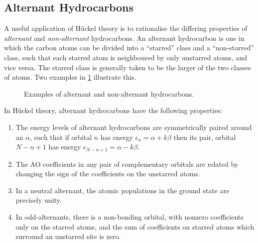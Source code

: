 \documentclass{article}
\theoremstyle{plain}\theoremheaderfont{\normalfont\itshape}\theorembodyfont{\rmfamily}\theoremseparator{.}\newtheorem*{rem}{Remark}\newtheorem*{ex}{Example}\newtheorem*{proof}{Proof}\newtheorem*{altp}{Alternative proof}
\theoremstyle{plain}\theoremheaderfont{\normalfont\bfseries}\theorembodyfont{\rmfamily}\theoremseparator{.}\newtheorem{thm}{Theorem}[section]\newtheorem{lem}[thm]{Lemma}\newtheorem{prop}[thm]{Proposition}\newtheorem*{cor}{Corollary}\newtheorem{defn}[thm]{Definition}\newtheorem{clm}[thm]{Claim}\newtheorem{clminproof}{Claim}\newtheorem{pos}{Postulate}[section]
\theoremstyle{break}\theoremheaderfont{\normalfont\itshape}\theorembodyfont{\rmfamily}\theoremseparator{.\medskip}\newtheorem*{proofskip}{Proof}\newtheorem*{exs}{Examples}\newtheorem*{rems}{Remarks}
\theoremstyle{break}\theoremheaderfont{\normalfont\bfseries}\theorembodyfont{\rmfamily}\theoremseparator{.\medskip}\newtheorem{lemskip}[thm]{Lemma}\newtheorem{defnskip}[thm]{Definition}\newtheorem{propskip}[thm]{Proposition}\newtheorem{thmskip}[thm]{Theorem}
\numberwithin{equation}{section}
\begin{document}
    \subsection{Alternant Hydrocarbons}
    A useful application of H\"{u}ckel theory is to rationalise the differing properties of \textit{alternant} and \textit{non-alternant} hydrocarbons. An alternant hydrocarbon is one in which the carbon atoms can be divided into a ``starred'' class and a ``non-starred'' class, such that each starred atom is neighboured by only unstarred atoms, and vice versa. The starred class is generally taken to be the larger of the two classes of atoms. Two examples in \cref{Fig:Alternant_Hydrocarbon} illustrate this.
    \begin{figure}
        \centering
        \caption{Examples of alternant and non-alternant hydrocarbons.}
        \label{Fig:Alternant_Hydrocarbon}
    \end{figure}

    In H\"{u}ckel theory, alternant hydrocarbons have the following properties:
    \begin{enumerate}[topsep=0pt,label=(\roman*)]
        \item The energy levels of alternant hydrocarbons are symmetrically paired around an \(\alpha\), such that if orbital \(n\) has energy \(\epsilon_n=\alpha+k\beta\) then its pair, orbital \(N-n+1\) has energy \(\epsilon_{N-n+1}=\alpha-k\beta\).
        \item The AO coefficients in any pair of complementary orbitals are related by changing the sign of the coefficients on the unstarred atoms.
        \item In a neutral alternant, the atomic populations in the ground state are precisely unity.
        \item In odd-alternants, there is a non-bonding orbital, with nonzero coefficients only on the starred atoms, and the sum of coefficients on starred atoms which surround an unstarred site is zero.
    \end{enumerate}
\end{document}
